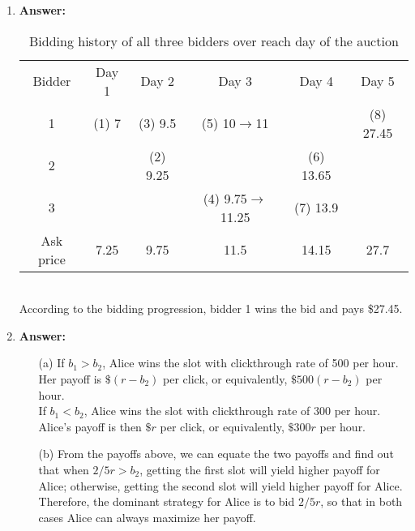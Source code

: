 \documentclass[12pt]{article}
\begin{document}
\begin{enumerate}
\item{} \textbf{Answer:}
\begin{table}[ht]
\caption{Bidding history of all three bidders over reach day of the auction}
\centering
\begin{tabular}{c c c c c c}
\hline\hline
Bidder & Day 1 & Day 2 & Day 3 & Day 4 & Day 5\\ [0.5ex]
1 & (1) 7 & (3) 9.5 & (5) 10$\rightarrow$11 &  & (8) 27.45 \\
2 &  & (2) 9.25 &  & (6) 13.65 & \\
3 &  &  & (4) 9.75$\rightarrow$11.25 & (7) 13.9 & \\
Ask price & 7.25 & 9.75 & 11.5 & 14.15 & 27.7 \\
\hline
\end{tabular}
\label{table: running time}
\end{table}\\
According to the bidding progression, bidder 1 wins the bid and pays \$27.45.

\item{} \textbf{Answer:}
\begin{itemize}
\item[(a)] If $b_1>b_2$, Alice wins the slot with clickthrough rate of 500 per hour. Her payoff is $\$(r-b_2)$ per click, or equivalently, $\$500(r-b_2)$ per hour.
\medskip\\
If $b_1<b_2$, Alice wins the slot with clickthrough rate of 300 per hour. Alice's payoff is then $\$r$ per click, or equivalently, $\$300r$ per hour.
\item[(b)] From the payoffs above, we can equate the two payoffs and find out that when $2/5r>b_2$, getting the first slot will yield higher payoff for Alice; otherwise, getting the second slot will yield higher payoff for Alice. Therefore, the dominant strategy for Alice is to bid $2/5r$, so that in both cases Alice can always maximize her payoff. 
\end{itemize}


\end{enumerate}
\end{document}

